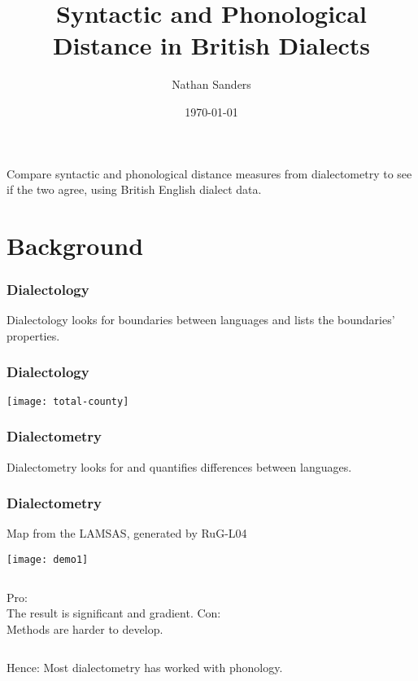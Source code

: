 \documentclass{beamer}
\title{Syntactic and Phonological Distance in British Dialects}
\author{Nathan Sanders}
\date{\today}
\begin{document}
\frame{\titlepage}

\section[Outline]{}
\frame{\tableofcontents}
\begin{frame}
  Compare syntactic and phonological distance measures from
  dialectometry to see if the two agree, using British English dialect data.
\end{frame}
\section{Background}
\begin{frame}
  \frametitle{Dialectology}
  \begin{definition}
    Dialectology looks for boundaries between languages and lists the
    boundaries' properties.
  \end{definition}
\end{frame}
\begin{frame}
  \frametitle{Dialectology}
  \texttt{[image: total-county]}
\end{frame}
\begin{frame}
  \frametitle{Dialectometry}

  \begin{definition}
    Dialectometry looks for and quantifies differences between languages.
  \end{definition}
  
\end{frame}
\begin{frame}
  \frametitle{Dialectometry}
  Map from the LAMSAS, generated by RuG-L04
  \begin{center}
  \texttt{[image: demo1]}
  \end{center}
\end{frame}
\begin{frame}
\begin{columns}
Pro:\\
  The result is significant and gradient.
Con: \\
  Methods are harder to develop.
\end{columns}
\vspace{2cm}
Hence: Most dialectometry has worked with phonology.
\end{frame}
\end{document}
